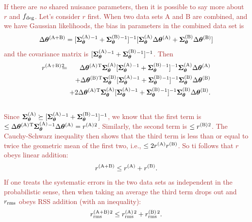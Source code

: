 \documentclass[usenatbib]{mnras}
\newcommand{\changetext}[1]{\textcolor{brown}{#1}}
\begin{document}
\changetext{If there are {\em no} shared nuisance parameters, then it is possible to say more about $r$ and $f_{\rm deg}$. Let's consider $r$ first. When two data sets A and B are combined, and we have Gaussian likelihoods, the bias in parameters in the combined data set is
\begin{equation}
\Delta{\boldsymbol\theta}^{(\rm A+B)} =
[{\boldsymbol\Sigma}_{\boldsymbol\theta}^{\rm(A)}{^{-1}}
+{\boldsymbol\Sigma}_{\boldsymbol\theta}^{\rm(B)}{^{-1}}]^{-1}
[{\boldsymbol\Sigma}_{\boldsymbol\theta}^{\rm(A)} \Delta{\boldsymbol\theta}^{(\rm A)} +
{\boldsymbol\Sigma}_{\boldsymbol\theta}^{\rm(B)} \Delta{\boldsymbol\theta}^{(\rm B)}]
\end{equation}
and the covariance matrix is $[{\boldsymbol\Sigma}_{\boldsymbol\theta}^{\rm(A)}{^{-1}} + {\boldsymbol\Sigma}_{\boldsymbol\theta}^{\rm(B)}{^{-1}}]^{-1}$. Then
\begin{eqnarray}
r^{\rm(A+B)}{^2}\!\!\!\! &=& \!\!\!\!
\Delta{\boldsymbol\theta}^{(\rm A)}{^{\rm T}} {\boldsymbol\Sigma}_{\boldsymbol\theta}^{\rm(A)} 
 [{\boldsymbol\Sigma}_{\boldsymbol\theta}^{\rm(A)}{^{-1}}
+{\boldsymbol\Sigma}_{\boldsymbol\theta}^{\rm(B)}{^{-1}}]^{-1}
{\boldsymbol\Sigma}_{\boldsymbol\theta}^{\rm(A)} \Delta{\boldsymbol\theta}^{(\rm A)}
\nonumber \\
&& \!\!\!\!
+
\Delta{\boldsymbol\theta}^{(\rm B)}{^{\rm T}} {\boldsymbol\Sigma}_{\boldsymbol\theta}^{\rm(B)} 
 [{\boldsymbol\Sigma}_{\boldsymbol\theta}^{\rm(A)}{^{-1}}
+{\boldsymbol\Sigma}_{\boldsymbol\theta}^{\rm(B)}{^{-1}}]^{-1}
{\boldsymbol\Sigma}_{\boldsymbol\theta}^{\rm(B)} \Delta{\boldsymbol\theta}^{(\rm B)}
\nonumber \\
&& \!\!\!\!
+ 2
\Delta{\boldsymbol\theta}^{(\rm A)}{^{\rm T}} {\boldsymbol\Sigma}_{\boldsymbol\theta}^{\rm(A)} 
 [{\boldsymbol\Sigma}_{\boldsymbol\theta}^{\rm(A)}{^{-1}}
+{\boldsymbol\Sigma}_{\boldsymbol\theta}^{\rm(B)}{^{-1}}]^{-1}
{\boldsymbol\Sigma}_{\boldsymbol\theta}^{\rm(B)} \Delta{\boldsymbol\theta}^{(\rm B)}.
\nonumber \\ &&
\end{eqnarray}
Since ${\boldsymbol\Sigma}_{\boldsymbol\theta}^{\rm(A)} \succeq [{\boldsymbol\Sigma}_{\boldsymbol\theta}^{\rm(A)}{^{-1}}
+{\boldsymbol\Sigma}_{\boldsymbol\theta}^{\rm(B)}{^{-1}}]^{-1}$, we know that the first term is $\le \Delta{\boldsymbol\theta}^{(\rm A)}{^{\rm T}} {\boldsymbol\Sigma}_{\boldsymbol\theta}^{\rm(A)}{^{-1}}\Delta{\boldsymbol\theta}^{(\rm A)} = r^{\rm(A)}{^2}$.
Similarly, the second term is $\le r^{\rm(B)}{^2}$. The Cauchy-Schwarz inequality then shows that the third term is less than or equal to twice the geometric mean of the first two, i.e., $\le 2r^{\rm(A)} r^{\rm(B)}$. So ti follows that $r$ obeys linear addition:
\begin{equation}
r^{\rm(A+B)} \le r^{\rm(A)} + r^{\rm(B)}.
\end{equation}
If one treats the systematic errors in the two data sets as independent in the probabilistic sense, then when taking an average the third term drops out and $r_{\rm rms}$ obeys RSS addition (with an inequality):
\begin{equation}
r_{\rm rms}^{\rm(A+B)}{^2} \le r_{\rm rms}^{\rm(A)}{^2} + r_{\rm rms}^{\rm(B)}{^2}.
\end{equation}
}
\end{document}
